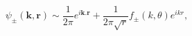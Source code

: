 \begin{equation}
\label{Eq_0214}
\psi_{\pm}(\mathbf{k}, \mathbf{r})
  \sim \frac{1}{2\pi} e^{i\mathbf{k}.\mathbf{r}}
  + \frac{1}{2\pi\sqrt{r}} f_{\pm}(k, \theta) e^{ikr},
\end{equation}

